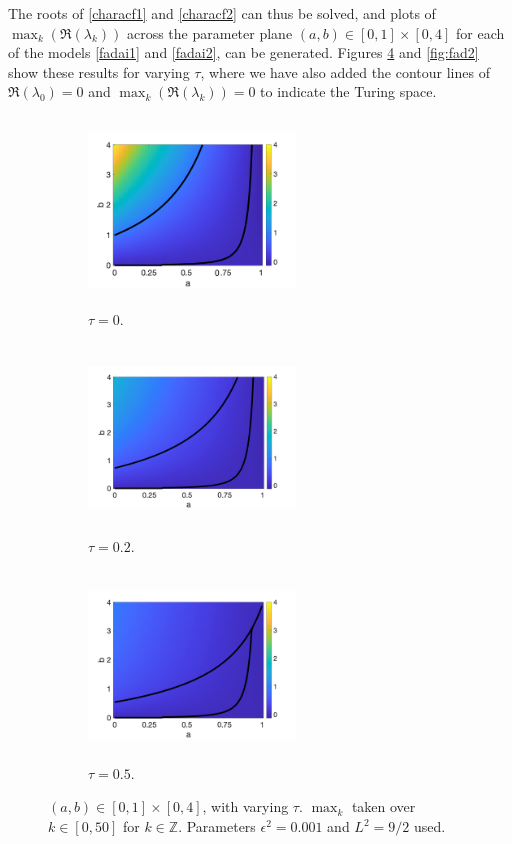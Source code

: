 The roots of \eqref{characf1} and \eqref{characf2} can thus be solved, and plots of $\max_k(\Re(\lambda_k))$ across the parameter plane $(a,b)\in[0,1]\times[0,4]$ for each of the models \eqref{fadai1} and \eqref{fadai2}, can be generated. Figures \ref{fig:fad1} and \ref{fig:fad2} show these results for varying $\tau$, where we have also added the contour lines of $\Re(\lambda_0)=0$ and $\max_k(\Re(\lambda_k))=0$ to indicate the Turing space.
\begin{figure}[H]
    \centering
    \begin{subfigure}[t]{0.32\textwidth}
        \centering
        \includegraphics[width=5.5cm,height = 5cm]{f1t0.png}
        \caption{$\tau=0$.}
        \label{}
    \end{subfigure}
    \hfill
    \begin{subfigure}[t]{0.32\textwidth}
        \centering
        \includegraphics[width=5.5cm,height = 5cm]{f1t02.png}
        \caption{$\tau=0.2$.}
        \label{}
    \end{subfigure}
    \hfill
    \begin{subfigure}[t]{0.32\textwidth}
        \centering
        \includegraphics[width=5.5cm,height = 5cm]{f1t05.png}
        \caption{$\tau=0.5$.}
        \label{f}
    \end{subfigure}
    \caption{ $(a,b)\in[0,1]\times[0,4]$, with varying $\tau$. $\max_k$ taken over $k\in[0,50]$ for $k\in\mathbb{Z}$. Parameters $\epsilon^2=0.001$ and $L^2=9/2$ used.}
    \label{fig:fad1}
\end{figure}

